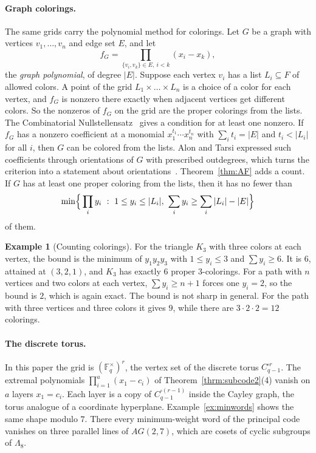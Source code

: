\documentclass[12pt,letterpaper]{article}
\numberwithin{equation}{section}
\theoremstyle{definition}
\newtheorem{example}[theorem]{Example}
\theoremstyle{remark}
\newcommand{\Fqs}{\mathbb{F}_q^{\times}}
\begin{document}
\paragraph{Graph colorings.}
The same grids carry the polynomial method for colorings. Let $G$ be a graph
with vertices $v_1,\dots,v_n$ and edge set $E$, and let
\[
f_G=\prod_{\{v_i,v_k\}\in E,\ i<k}(x_i-x_k),
\]
the \emph{graph polynomial}, of degree $|E|$. Suppose each vertex $v_i$ has a
list $L_i\subseteq F$ of allowed colors. A point of the grid
$L_1\times\dots\times L_n$ is a choice of a color for each vertex, and $f_G$
is nonzero there exactly when adjacent vertices get different colors. So the
nonzeros of $f_G$ on the grid are the proper colorings from the lists. The
Combinatorial Nullstellensatz~\cite{Al99} gives a condition for at least one
nonzero. If $f_G$ has a nonzero coefficient at a monomial
$x_1^{t_1}\cdots x_n^{t_n}$ with $\sum_it_i=|E|$ and $t_i<|L_i|$ for all
$i$, then $G$ can be colored from the lists. Alon and Tarsi expressed such
coefficients through orientations of $G$ with prescribed outdegrees, which
turns the criterion into a statement about orientations~\cite{AT92}. Theorem~\ref{thm:AF} adds a count. If $G$ has
at least one proper coloring from the lists, then it has no fewer than
\[
\min\Bigl\{\,\prod_iy_i\ :\ 1\le y_i\le|L_i|,\
\sum_iy_i\ge\sum_i|L_i|-|E|\Bigr\}
\]
of them.

\begin{example}[Counting colorings]\label{ex:colorings}
For the triangle $K_3$ with three colors at each vertex, the bound is the
minimum of $y_1y_2y_3$ with $1\le y_i\le3$ and $\sum y_i\ge6$. It is $6$,
attained at $(3,2,1)$, and $K_3$ has exactly $6$ proper $3$-colorings. For a
path with $n$ vertices and two colors at each vertex, $\sum y_i\ge n+1$
forces one $y_i=2$, so the bound is $2$, which is again exact. The bound is
not sharp in general. For the path with three vertices and three colors it
gives $9$, while there are $3\cdot2\cdot2=12$ colorings.
\end{example}

\paragraph{The discrete torus.}
In this paper the grid is $(\Fqs)^r$, the vertex set of the discrete torus
$C_{q-1}^{\square r}$. The extremal polynomials $\prod_{i=1}^a(x_1-c_i)$ of
Theorem~\ref{thrm:subcode2}(4) vanish on $a$ layers $x_1=c_i$. Each layer is
a copy of $C_{q-1}^{\square(r-1)}$ inside the Cayley graph, the torus
analogue of a coordinate hyperplane. Example~\ref{ex:minwords} shows the
same shape modulo $7$. There every minimum-weight word of the principal code
vanishes on three parallel lines of $AG(2,7)$, which are cosets of cyclic
subgroups of $\Lambda_8$.
\end{document}
